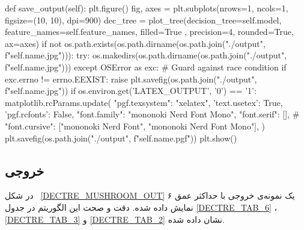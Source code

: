 \begin{latin}
  \begin{python}
    def save_output(self):
        plt.figure()
        fig, axes = plt.subplots(nrows=1, ncols=1,
                figsize=(10, 10), dpi=900)
        dec_tree = plot_tree(decision_tree=self.model, feature_names=self.feature_names,
                             filled=True , precision=4, rounded=True, ax=axes)
        if not os.path.exists(os.path.dirname(os.path.join("./output",
            f"{self.name}.jpg"))):
            try: os.makedirs(os.path.dirname(os.path.join("./output",
                f"{self.name}.jpg")))
            except OSError as exc: # Guard against race condition
                if exc.errno != errno.EEXIST:
                    raise
        plt.savefig(os.path.join("./output", f"{self.name}.jpg"))
        if os.environ.get('LATEX_OUTPUT', '0') == '1':
            matplotlib.rcParams.update({
                "pgf.texsystem": "xelatex",
                'text.usetex': True,
                'pgf.rcfonts': False,
                "font.family": "mononoki Nerd Font Mono",
                "font.serif": [],
                #  "font.cursive": ["mononoki Nerd Font", "mononoki Nerd Font Mono"],
            })
            plt.savefig(os.path.join("./output", f"{self.name}.pgf"))
        plt.show()
  \end{python}
\end{latin}

\subsection{خروجی}
در شکل
~\cref{DECTRE_MUSHROOM_OUT}
یک نمونه‌ی خروجی
با حداکثر عمق ۶ نمایش داده شده.
دقت و صحت این الگوریتم در جدول
\cref{DECTRE_TAB_6}
،
\cref{DECTRE_TAB_3}
و
\cref{DECTRE_TAB_2}
نشان داده شده.


